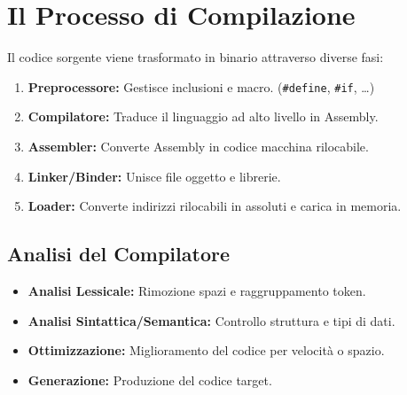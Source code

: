 \section{Il Processo di Compilazione}
Il codice sorgente viene trasformato in binario attraverso diverse fasi:

\begin{enumerate}
    \item \textbf{Preprocessore:} Gestisce inclusioni e macro. (\texttt{\#define}, \texttt{\#if}, \dots)
    \item \textbf{Compilatore:} Traduce il linguaggio ad alto livello in Assembly.
    \item \textbf{Assembler:} Converte Assembly in codice macchina rilocabile.
    \item \textbf{Linker/Binder:} Unisce file oggetto e librerie.
    \item \textbf{Loader:} Converte indirizzi rilocabili in assoluti e carica in memoria.
\end{enumerate}

\subsection{Analisi del Compilatore}
\begin{itemize}
    \item \textbf{Analisi Lessicale:} Rimozione spazi e raggruppamento token.
    \item \textbf{Analisi Sintattica/Semantica:} Controllo struttura e tipi di dati.
    \item \textbf{Ottimizzazione:} Miglioramento del codice per velocità o spazio.
    \item \textbf{Generazione:} Produzione del codice target.
\end{itemize}


